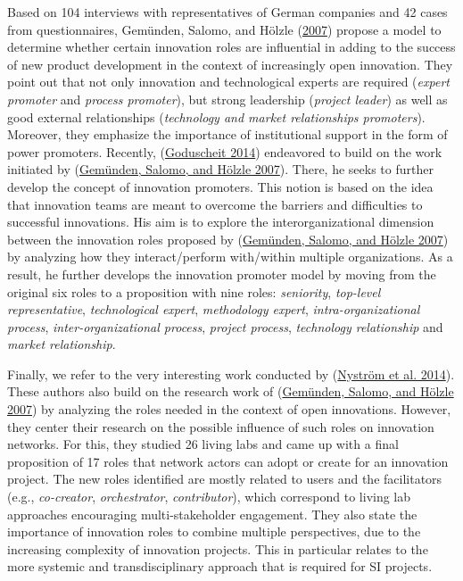 \documentclass[AMA,STIX1COL,APA,STIX2COL]{WileyNJD-v2}
\begin{document}
Based on 104 interviews with representatives of German companies and 42
cases from questionnaires, Gemünden, Salomo, and Hölzle
(\protect\hyperlink{ref-Gemunden2007}{2007}) propose a model to
determine whether certain innovation roles are influential in adding to
the success of new product development in the context of increasingly
open innovation. They point out that not only innovation and
technological experts are required (\emph{expert promoter} and
\emph{process promoter}), but strong leadership (\emph{project leader})
as well as good external relationships (\emph{technology and market
relationships promoters}). Moreover, they emphasize the importance of
institutional support in the form of power promoters. Recently,
(\protect\hyperlink{ref-Goduscheit2014}{Goduscheit 2014}) endeavored to
build on the work initiated by
(\protect\hyperlink{ref-Gemunden2007}{Gemünden, Salomo, and Hölzle
2007}). There, he seeks to further develop the concept of innovation
promoters. This notion is based on the idea that innovation teams are
meant to overcome the barriers and difficulties to successful
innovations. His aim is to explore the interorganizational dimension
between the innovation roles proposed by
(\protect\hyperlink{ref-Gemunden2007}{Gemünden, Salomo, and Hölzle
2007}) by analyzing how they interact/perform with/within multiple
organizations. As a result, he further develops the innovation promoter
model by moving from the original six roles to a proposition with nine
roles: \emph{seniority}, \emph{top-level representative},
\emph{technological expert}, \emph{methodology expert},
\emph{intra-organizational process}, \emph{inter-organizational
process}, \emph{project process}, \emph{technology relationship} and
\emph{market relationship}.

Finally, we refer to the very interesting work conducted by
(\protect\hyperlink{ref-Nystrom2014}{Nyström et al. 2014}). These
authors also build on the research work of
(\protect\hyperlink{ref-Gemunden2007}{Gemünden, Salomo, and Hölzle
2007}) by analyzing the roles needed in the context of open innovations.
However, they center their research on the possible influence of such
roles on innovation networks. For this, they studied 26 living labs and
came up with a final proposition of 17 roles that network actors can
adopt or create for an innovation project. The new roles identified are
mostly related to users and the facilitators (e.g., \emph{co-creator},
\emph{orchestrator}, \emph{contributor}), which correspond to living lab
approaches encouraging multi-stakeholder engagement. They also state the
importance of innovation roles to combine multiple perspectives, due to
the increasing complexity of innovation projects. This in particular
relates to the more systemic and transdisciplinary approach that is
required for SI projects.
\end{document}

